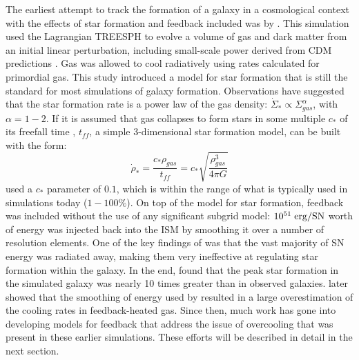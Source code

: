 The earliest attempt to track the formation of a galaxy in a cosmological
context with the effects of star formation and feedback included was by
\citet{Katz1992}.  This simulation used the Lagrangian TREESPH 
\citep{Hernquist1989} to evolve a volume of gas and dark matter from an initial
linear perturbation, including small-scale power derived from CDM predictions
\citep{Zeldovich1970,Peebles1982}.  Gas was allowed to cool radiatively using
rates calculated for primordial gas.  This study introduced a model for star
formation that is still the standard for most simulations of galaxy formation.
Observations \citep{Kennicutt1998} have suggested that the star formation rate
is a power law of the gas density: $\dot\Sigma_*\propto\Sigma_{gas}^\alpha$, with
$\alpha=1-2$.  If it is assumed that gas collapses to form stars in some
multiple $c_*$ of its freefall time \citep{Schmidt1959}, $t_{ff}$, a simple
3-dimensional star formation model, can be built with the form:
\begin{equation}
    \dot\rho_* = \frac{c_*\rho_{gas}}{t_{ff}} = c_*\sqrt{\frac{\rho^3_{gas}}{4\pi G}}
\end{equation}
\citet{Katz1992} used a $c_*$ parameter of $0.1$, which is within the range of
what is typically used in simulations today ($1-100\%$).  On top of the model
for star formation, feedback was included without the use of any significant
subgrid model:  $10^{51}\;\rm{erg/SN}$ worth of energy was injected back into
the ISM by smoothing it over a number of resolution elements.  One of the key
findings of \citet{Katz1992} was that the vast majority of SN energy was
radiated away, making them very ineffective at regulating star formation within
the galaxy.  In the end, \citet{Katz1992} found that the peak star formation in
the simulated galaxy was nearly 10 times greater than in observed galaxies.
\citet{Thacker2000} later showed that the smoothing of energy used by
\citet{Katz1992} resulted in a large overestimation of the cooling rates in
feedback-heated gas. Since then, much work has gone into developing models for
feedback that address the issue of overcooling that was present in these
earlier simulations.  These efforts will be described in detail in the next
section.

